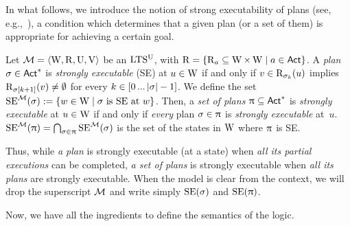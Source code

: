 \medskip

In what follows, we introduce the notion of strong executability of plans (see, e.g.,~\cite{Wang15lori,AFSVQ23report}), a condition which determines that a given plan (or a set of them) is appropriate for achieving a certain goal.

\medskip


\begin{definition}\label{def:plans-exec}
Let $\mathcal{M}=\langle \operatorname{W}, \operatorname{R}, \operatorname{U}, \operatorname{V} \rangle$ be an $\textup{LTS$^\text{\textup{U}}$}$, with $\operatorname{R}=\{ \operatorname{R}_a\subseteq \operatorname{W} \times \operatorname{W} \mid a\in{\rm \sf Act} \}$. A \emph{plan} $\sigma \in {\rm \sf Act}^*$ is \emph{strongly executable} (SE) at $u \in \operatorname{W}$ if and only if $v \in \operatorname{R}_{\sigma_k}(u)$ implies $\operatorname{R}_{\sigma[k+1]}(v) \neq \emptyset$ for every $k \in [0 \mathop{...} |{\sigma}|-1]$.
We define the set $\operatorname{SE}^{\mathcal{M}}(\sigma):= \{ w\in\operatorname{W} \mid \sigma \mbox{ is SE at }w \}$.
Then, a \emph{set of plans} $\uppi \subseteq {\rm \sf Act}^*$ is \emph{strongly executable} at $u \in \operatorname{W}$ if and only if \emph{every} plan $\sigma \in \uppi$ is \emph{strongly executable} at~$u$.
$\operatorname{SE}^{\mathcal{M}}(\uppi) = \bigcap_{\sigma \in \uppi} \operatorname{SE}^{\mathcal{M}}(\sigma)$ is the set of the states in $\operatorname{W}$ where $\uppi$ is SE.
\end{definition}
\medskip


Thus, while \emph{a plan} is strongly executable (at a state) when \emph{all its partial executions} %
can be completed, \emph{a set of plans} is strongly executable when \emph{all its plans} are strongly executable. When the model is clear from the context, we will drop the superscript $\mathcal{M}$ and write simply $\operatorname{SE}(\sigma)$ and $\operatorname{SE}(\uppi)$.


Now, we have all the ingredients to define the semantics of the logic.
\medskip

